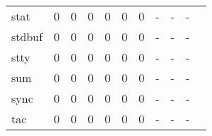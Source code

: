 \begin{longtable}{lp{1.20cm}p{1.20cm}p{1.20cm}p{1.20cm}p{1.20cm}p{1.20cm}p{1.20cm}p{1.20cm}p{1.20cm}p{1.20cm}}
stat      &                                     0 &                                                  0 &                                                  0 &                                                  0 &                                                  0 &                                                  0 &                                             - &                                                  - &                                                  - \\
stdbuf    &                                     0 &                                                  0 &                                                  0 &                                                  0 &                                                  0 &                                                  0 &                                             - &                                                  - &                                                  - \\
stty      &                                     0 &                                                  0 &                                                  0 &                                                  0 &                                                  0 &                                                  0 &                                             - &                                                  - &                                                  - \\
sum       &                                     0 &                                                  0 &                                                  0 &                                                  0 &                                                  0 &                                                  0 &                                             - &                                                  - &                                                  - \\
sync      &                                     0 &                                                  0 &                                                  0 &                                                  0 &                                                  0 &                                                  0 &                                             - &                                                  - &                                                  - \\
tac       &                                     0 &                                                  0 &                                                  0 &                                                  0 &                                                  0 &                                                  0 &                                             - &                                                  - &                                                  - \\

\end{longtable}
